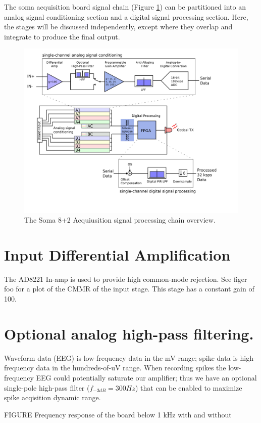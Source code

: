 
The soma acquisition board signal chain (Figure \ref{signalchain}) can be partitioned into an analog signal conditioning section and a digital signal processing section. Here, the stages will be discussed independently, except where they overlap and integrate to produce the final output.
\begin{figure}
\includegraphics[scale=1.0]{signalchain.svg}
\caption{The Soma 8+2 Acquiusition signal processing chain overview.}
\label{signalchain}
\end{figure}

\section{Input Differential Amplification}

The AD8221 In-amp is used to provide high common-mode rejection. See figer foo for a plot of the CMMR of the input stage. This stage has a constant gain of 100. 


\section{Optional analog high-pass filtering.}
Waveform data (EEG) is low-frequency data in the mV range; spike data is high-frequency data in the hundreds-of-uV range. When recording spikes the low-frequency EEG could potentially saturate our amplifier; thus we have an optional single-pole high-pass filter ($f_{-3dB}=300 Hz$) that can be enabled to maximize spike acqisition dynamic range. 

FIGURE Frequency response of the board below 1 kHz with and without 

